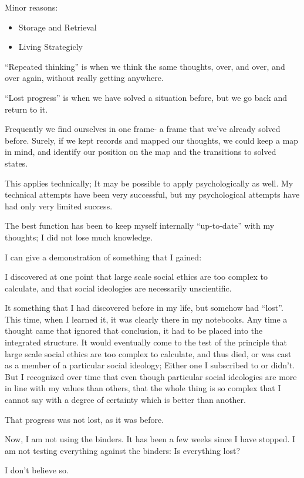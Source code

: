\documentclass[oneside]{book}
\begin{document}
Minor reasons:
\begin{itemize}
\item Storage and Retrieval
\item Living Strategicly
\end{itemize}

``Repeated thinking'' is when we think the same thoughts, over, and
over, and over again, without really getting anywhere.

``Lost progress'' is when we have solved a situation before, but we go
back and return to it.

Frequently we find ourselves in one frame- a frame that we've already
solved before. Surely, if we kept records and mapped our thoughts, we
could keep a map in mind, and identify our position on the map and the
transitions to solved states.

This applies technically; It may be possible to apply psychologically
as well. My technical attempts have been very successful, but my
psychological attempts have had only very limited success.

The best function has been to keep myself internally ``up-to-date'' with
my thoughts; I did not lose much knowledge.

I can give a demonstration of something that I gained:

I discovered at one point that large scale social ethics are too
complex to calculate, and that social ideologies are necessarily
unscientific.

It something that I had discovered before in my life, but somehow had
``lost''. This time, when I learned it, it was clearly there in my
notebooks. Any time a thought came that ignored that conclusion, it
had to be placed into the integrated structure. It would eventually
come to the test of the principle that large scale social ethics are
too complex to calculate, and thus died, or was cast as a member of a
particular social ideology; Either one I subscribed to or didn't. But
I recognized over time that even though particular social ideologies
are more in line with my values than others, that the whole thing is
so complex that I cannot say with a degree of certainty which is
better than another.

That progress was not lost, as it was before.

Now, I am not using the binders. It has been a few weeks since I have
stopped. I am not testing everything against the binders: Is
everything lost?

I don't believe so.
\end{document}
